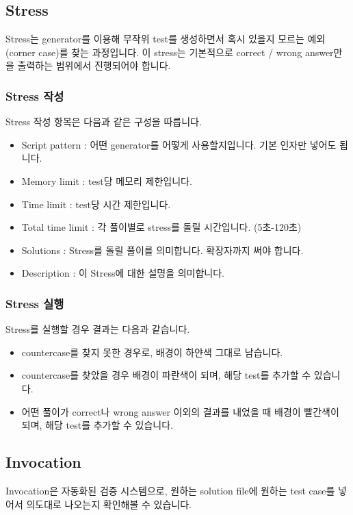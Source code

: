 \documentclass{article}
\begin{document}
    \subsection{Stress}
    Stress는 generator를 이용해 무작위 test를 생성하면서 혹시 있을지 모르는 예외(corner case)를 찾는 과정입니다. 이 stress는 기본적으로 correct / wrong answer만을 출력하는 범위에서 진행되어야 합니다.
    \subsubsection{Stress 작성}
    Stress 작성 항목은 다음과 같은 구성을 따릅니다.
    \begin{itemize}
        \item Script pattern : 어떤 generator를 어떻게 사용할지입니다. 기본 인자만 넣어도 됩니다.
        \item Memory limit : test당 메모리 제한입니다.
        \item Time limit : test당 시간 제한입니다.
        \item Total time limit : 각 풀이별로 stress를 돌릴 시간입니다. (5초-120초)
        \item Solutions : Stress를 돌릴 풀이를 의미합니다.
        확장자까지 써야 합니다.
        \item Description : 이 Stress에 대한 설명을 의미합니다.
    \end{itemize}
    \subsubsection{Stress 실행}
    Stress를 실행할 경우 결과는 다음과 같습니다.
    \begin{itemize}
        \item countercase를 찾지 못한 경우로, 배경이 하얀색 그대로 남습니다.
        \item countercase를 찾았을 경우 배경이 {\color{blue}파란색}이 되며, 해당 test를 추가할 수 있습니다.
        \item 어떤 풀이가 correct나 wrong answer 이외의 결과를 내었을 때 배경이 {\color{red}빨간색}이 되며, 해당 test를 추가할 수 있습니다.
    \end{itemize}
    \subsection{Invocation}
    Invocation은 자동화된 검증 시스템으로, 원하는 solution file에 원하는 test case를 넣어서 의도대로 나오는지 확인해볼 수 있습니다.
\end{document}
